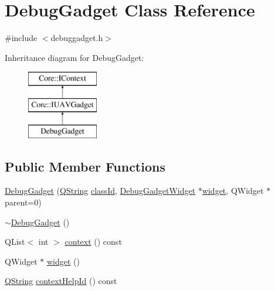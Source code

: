 \hypertarget{class_debug_gadget}{\section{\-Debug\-Gadget \-Class \-Reference}
\label{class_debug_gadget}
}


{\ttfamily \#include $<$debuggadget.\-h$>$}

\-Inheritance diagram for \-Debug\-Gadget\-:\begin{figure}[H]
\begin{center}
\leavevmode
\includegraphics[height=3.000000cm]{class_debug_gadget}
\end{center}
\end{figure}
\subsection*{\-Public \-Member \-Functions}
\begin{DoxyCompactItemize}
\item 
\hyperlink{group___debug_gadget_plugin_gae32cda168c382c01595bc348472e69f0}{\-Debug\-Gadget} (\hyperlink{group___u_a_v_objects_plugin_gab9d252f49c333c94a72f97ce3105a32d}{\-Q\-String} \hyperlink{group___core_plugin_ga3878fde66a57220608960bcc3fbeef2c}{class\-Id}, \hyperlink{class_debug_gadget_widget}{\-Debug\-Gadget\-Widget} $\ast$\hyperlink{group___debug_gadget_plugin_ga08f35a753d418ed6e9d9594bcce8fee8}{widget}, \-Q\-Widget $\ast$parent=0)
\item 
\hyperlink{group___debug_gadget_plugin_gab1dfec6b8b4cb29fa466e6102d3096ac}{$\sim$\-Debug\-Gadget} ()
\item 
\-Q\-List$<$ int $>$ \hyperlink{group___debug_gadget_plugin_gaaf1624068acedd32979ab08deddefe6e}{context} () const 
\item 
\-Q\-Widget $\ast$ \hyperlink{group___debug_gadget_plugin_ga08f35a753d418ed6e9d9594bcce8fee8}{widget} ()
\item 
\hyperlink{group___u_a_v_objects_plugin_gab9d252f49c333c94a72f97ce3105a32d}{\-Q\-String} \hyperlink{group___debug_gadget_plugin_ga123c9f10792e9dcd8f128da2be20f176}{context\-Help\-Id} () const 
\end{DoxyCompactItemize}


